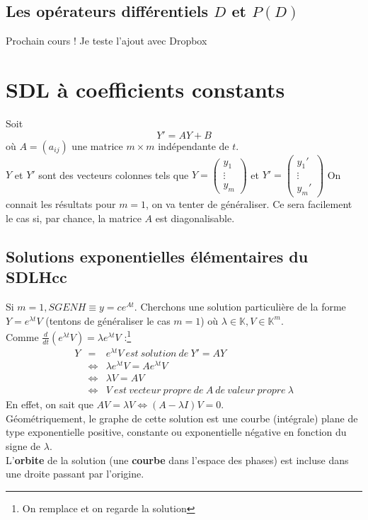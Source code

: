 \documentclass	[11pt, a4paper, openany]{book}
\begin{document}
	\subsection{Les opérateurs différentiels $D$ et $P(D)$}
	Prochain cours ! 
	Je teste l'ajout avec Dropbox
	\fi 
	
	
	
	\setcounter{section}{2}
	\section{SDL à coefficients constants}
	Soit 
	\begin{equation}
		Y' = AY + B
	\end{equation}
	où $A = (a_{ij})$ une matrice $m\times m$ indépendante de $t$.\\
	$Y$ et $Y'$ sont des vecteurs colonnes tels que $Y = \left(\begin{array}{l}
	y_1\\
	\vdots\\
	y_m
	\end{array}\right)$ et $Y' = \left(\begin{array}{l}
	y_1'\\
	\vdots\\
	y_m'
	\end{array}\right)$
	On connait les résultats pour $m=1$, on va tenter de généraliser. Ce sera facilement le cas si, par chance, la matrice $A$ est diagonalisable.
	
	\subsection{Solutions exponentielles élémentaires du SDLHcc}
	Si $m=1, SGENH \equiv y = ce^{At}$. Cherchons une solution particulière de la forme $Y = e^{\lambda t}V$ (tentons de généraliser le cas $m=1$) où $\lambda \in \mathbb{K}, V \in \mathbb{K}^m$.\\
	Comme $\frac{d}{dt}(e^{\lambda t}V) = \lambda e^{\lambda t}V$ :\footnote{On remplace et on regarde la solution}
	\begin{eqnarray}
		Y &=& e^{\lambda t}V\ est\ solution\ de\ Y'=AY\\
		&\Leftrightarrow & \lambda e^{\lambda t}V = Ae^{\lambda t}V\\
		&\Leftrightarrow & \lambda V = AV\\
		&\Leftrightarrow &V\ est\ vecteur\ propre\ de\ A\ de\ valeur\ propre\ \lambda
	\end{eqnarray}
	En effet, on sait que $AV = \lambda V \Leftrightarrow(A-\lambda I)V = 0$.\\
	Géométriquement, le graphe de cette solution est une courbe (intégrale) plane de type exponentielle positive, constante ou exponentielle négative en fonction du signe de $\lambda$.\\
	L'\textbf{orbite} de la solution (une \textbf{courbe} dans l'espace des phases) est incluse dans une droite passant par l'origine.
	
\end{document}
